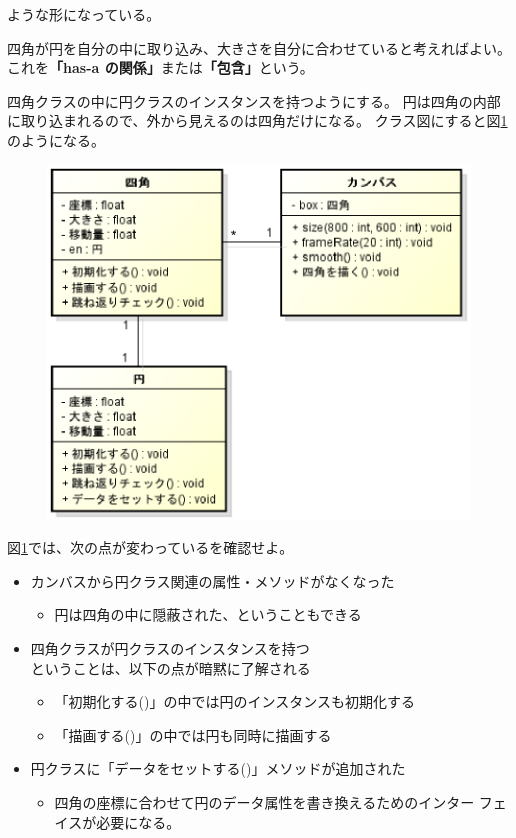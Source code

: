 \documentclass[uplatex,a4j,11pt]{jsarticle}
\begin{document}
ような形になっている。

四角が円を自分の中に取り込み、大きさを自分に合わせていると考えればよい。
これを{\bfseries 「has-a の関係」}または{\bfseries 「包含」}という。

四角クラスの中に円クラスのインスタンスを持つようにする。
円は四角の内部に取り込まれるので、外から見えるのは四角だけになる。
クラス図にすると図\ref{zu8}のようになる。

\begin{figure}[htbp]
 \begin{center}
   \includegraphics[width=.5\paperwidth]{zu10.eps}
   \caption{}
   \label{zu8}
 \end{center}
\end{figure}

\newpage
図\ref{zu8}では、次の点が変わっているを確認せよ。
\begin{itemize}
 \item カンバスから円クラス関連の属性・メソッドがなくなった
       \begin{itemize}
        \item 円は四角の中に隠蔽された、ということもできる
       \end{itemize}
 \item 四角クラスが円クラスのインスタンスを持つ\\
       ということは、以下の点が暗黙に了解される
       \begin{itemize}
        \item 「初期化する()」の中では円のインスタンスも初期化する
        \item 「描画する()」の中では円も同時に描画する
       \end{itemize}
 \item 円クラスに「データをセットする()」メソッドが追加された
       \begin{itemize}
        \item 四角の座標に合わせて円のデータ属性を書き換えるためのインター
              フェイスが必要になる。
       \end{itemize}
\end{itemize}
\end{document}
